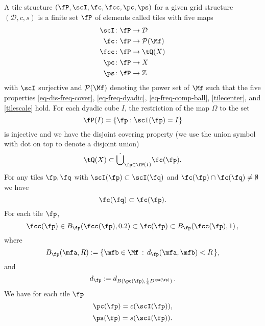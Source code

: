 A tile structure $(\fP,\scI,\fc,\fcc,\pc,\ps)$
for a given grid structure $(\mathcal{D}, c, s)$
is a finite set $\fP$ of elements called tiles with five maps
\begin{align*}
    \scI&\colon \fP\to {\mathcal{D}}\\
    \fc&\colon \fP\to \mathcal{P}(\Mf) \\
    \fcc &\colon \fP\to \tQ(X)\\
    \pc &\colon \fP\to X\\
    \ps &\colon \fP\to \mathbb{Z}
\end{align*}
with $\scI$ surjective and $\mathcal{P}(\Mf)$ denoting the power set of $\Mf$ such that the five properties \eqref{eq-dis-freq-cover}, \eqref{eq-freq-dyadic},
\eqref{eq-freq-comp-ball}, \eqref{tilecenter}, and
\eqref{tilescale} hold.
For each dyadic cube $I$, the restriction of the map $\Omega$ to the set
\begin{equation}\label{injective}
    \fP(I)=\{\fp: \scI(\fp) =I\}
\end{equation}
is injective
and we have the disjoint covering property (we use the union symbol with dot on top to denote a disjoint union)
\begin{equation}\label{eq-dis-freq-cover}
    \tQ(X)\subset \dot{\bigcup}_{\fp\in \fP(I)}\fc(\fp).
\end{equation}
For any tiles $\fp,\fq$ with $\scI(\fp)\subset \scI(\fq)$ and $\fc(\fp) \cap \fc(\fq) \neq \emptyset$ we have
\begin{equation} \label{eq-freq-dyadic}
    \fc(\fq)\subset \fc(\fp) .
\end{equation}
For each tile $\fp$,
\begin{equation}\label{eq-freq-comp-ball}
    \fcc(\fp)\in B_{\fp}(\fcc(\fp), 0.2) \subset \fc(\fp) \subset B_{\fp}(\fcc(\fp),1)\,,
\end{equation}
where
\begin{equation}
    B_{\fp} (\mfa, R) := \{\mfb \in \Mf \, : \, d_{\fp}(\mfa, \mfb) < R\,\} ,
\end{equation}
and
\begin{equation}\label{defdp}
    d_{\fp} := d_{B(\pc(\fp),\frac 14 D^{\ps(\fp)})}\, .
\end{equation}
We have for each tile $\fp$
\begin{equation}\label{tilecenter}
    \pc(\fp)=c(\scI(\fp)),
\end{equation}
\begin{equation}\label{tilescale}
    \ps(\fp)=s(\scI(\fp)).
\end{equation}


